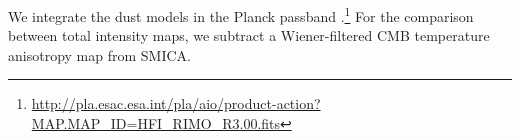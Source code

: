 \documentclass[twocolumn]{aastex631}
\begin{document}
We integrate the dust models in the Planck passband \citep{planck2013-p03d}.\footnote{\url{http://pla.esac.esa.int/pla/aio/product-action?MAP.MAP_ID=HFI_RIMO_R3.00.fits}} For the comparison between total intensity maps, we subtract a Wiener-filtered CMB temperature anisotropy map from SMICA.



\end{document}
